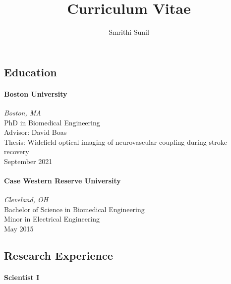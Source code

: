 \documentclass[
  letterpaper,
  DIV=11,
  numbers=noendperiod]{scrartcl}
\title{Curriculum Vitae}
\subtitle{Smrithi Sunil}
\author{}
\date{}
\let\oldparagraph\paragraph
\renewcommand{\paragraph}[1]{\oldparagraph{#1}\mbox{}}
\begin{document}
\maketitle
\ifdefined\Shaded\renewenvironment{Shaded}{\begin{tcolorbox}[breakable, frame hidden, enhanced, boxrule=0pt, borderline west={3pt}{0pt}{shadecolor}, sharp corners, interior hidden]}{\end{tcolorbox}}\fi

\hypertarget{education}{%
\subsection{Education}\label{education}}

\hypertarget{boston-university}{%
\paragraph{Boston University}\label{boston-university}}

\emph{Boston, MA}\\
PhD in Biomedical Engineering\\
Advisor: David Boas\\
Thesis: Widefield optical imaging of neurovascular coupling during
stroke recovery\\
September 2021

\hypertarget{case-western-reserve-university}{%
\paragraph{Case Western Reserve
University}\label{case-western-reserve-university}}

\emph{Cleveland, OH}\\
Bachelor of Science in Biomedical Engineering\\
Minor in Electrical Engineering\\
May 2015

\hypertarget{research-experience}{%
\subsection{Research Experience}\label{research-experience}}

\hypertarget{scientist-i}{%
\paragraph{Scientist I}\label{scientist-i}}
\end{document}
